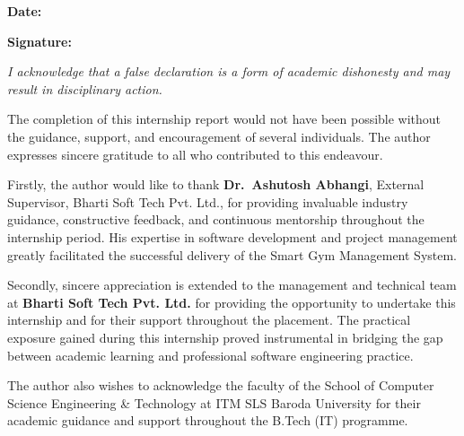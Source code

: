 \documentclass[
  12pt,
  a4paperpaper,
]{report}
\begin{document}
\vspace{0.25in}

\noindent

\begin{minipage}[t]{0.50\textwidth}
\textbf{Date:} \underline{\hspace{1.8in}}
\end{minipage}\hfill
\begin{minipage}[t]{0.45\textwidth}
\textbf{Signature:} \underline{\hspace{1.8in}}
\end{minipage}


\emph{I acknowledge that a false declaration is a form of academic
dishonesty and may result in disciplinary action.}

\vspace*{\fill}
\clearpage
\vspace*{\fill}
\label{acknowledgements}
\vspace{12pt}


\vspace{0.1in}

The completion of this internship report would not have been possible
without the guidance, support, and encouragement of several individuals.
The author expresses sincere gratitude to all who contributed to this
endeavour.

\medskip

Firstly, the author would like to thank \textbf{Dr.~Ashutosh Abhangi},
External Supervisor, Bharti Soft Tech Pvt. Ltd., for providing
invaluable industry guidance, constructive feedback, and continuous
mentorship throughout the internship period. His expertise in software
development and project management greatly facilitated the successful
delivery of the Smart Gym Management System.

\medskip

Secondly, sincere appreciation is extended to the management and
technical team at \textbf{Bharti Soft Tech Pvt. Ltd.} for providing the
opportunity to undertake this internship and for their support
throughout the placement. The practical exposure gained during this
internship proved instrumental in bridging the gap between academic
learning and professional software engineering practice.

\medskip

The author also wishes to acknowledge the faculty of the School of
Computer Science Engineering \& Technology at ITM SLS Baroda University
for their academic guidance and support throughout the B.Tech (IT)
programme.
\end{document}
